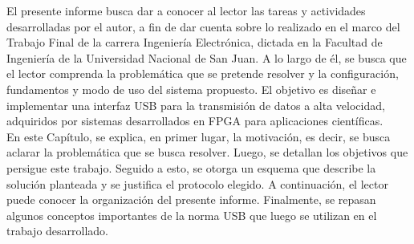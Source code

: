 El presente informe busca dar a conocer al lector las tareas y actividades desarrolladas por el autor, a fin de dar cuenta sobre lo realizado en el marco del Trabajo Final de la carrera Ingeniería Electrónica, dictada en la Facultad de Ingeniería de la Universidad Nacional de San Juan. A lo largo de él, se busca que el lector comprenda la problemática que se pretende resolver y la configuración, fundamentos y modo de uso del sistema propuesto. El objetivo es diseñar e implementar una interfaz USB para la transmisión de datos a alta velocidad, adquiridos por sistemas desarrollados en FPGA para aplicaciones científicas.\\


En este Capítulo, se explica, en primer lugar, la motivación, es decir, se busca aclarar la problemática que se busca resolver. Luego, se detallan los objetivos que persigue este trabajo. Seguido a esto, se otorga un esquema que describe la solución planteada y se justifica el protocolo elegido. A continuación, el lector puede conocer la organización del presente informe. Finalmente, se repasan algunos conceptos importantes de la norma USB que luego se utilizan en el trabajo desarrollado.\\ 